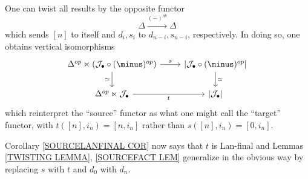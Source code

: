 \documentclass[a4paper,10pt]{article}%
\begin{document}
\begin{remark}\label{DUALRESULTS REM}
	One can twist all results by the opposite functor
	\[\Delta \xrightarrow{(\minus)^{op}} \Delta\]
	which sends $[n]$ to itself and $d_i,s_i$ to $d_{n-i},s_{n-i}$, respectively.
	In doing so, one obtains vertical isomorphisms	
\[
\begin{tikzcd}
	\Delta^{op} \ltimes \left(\mathcal{J}_{\bullet} \circ (\minus)^{op} \right) \ar{r}{s} \ar{d}[swap]{\simeq} &
	\left|\mathcal{J}_{\bullet} \circ (\minus)^{op}\right|
	\ar{d}{\simeq}
\\
	\Delta^{op} \ltimes \mathcal{J}_{\bullet} \ar{r}[swap]{t} &
	\left| \mathcal{J}_{\bullet} \right|
\end{tikzcd}
\]
which reinterpret the ``source'' functor as what one might call the ``target'' functor, with $t([n],i_n)= [n,i_n]$ rather than 
$s([n],i_n)= [0,i_n]$.

	Corollary \ref{SOURCELANFINAL COR} now says that $t$ is Lan-final
	and Lemmas \ref{TWISTING LEMMA}, \ref{SOURCEFACT LEM} generalize in the obvious way by replacing $s$ with $t$ and $d_0$ with $d_n$.
\end{remark}








\end{document}
